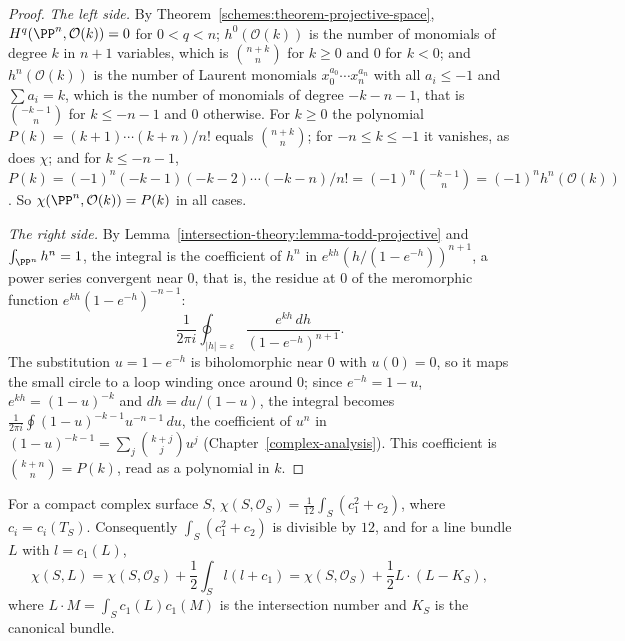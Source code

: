 \begin{proof}
\emph{The left side.} By Theorem~\ref{schemes:theorem-projective-space}, $H^q(\PP^n, \mathcal{O}(k)) = 0$ for $0 < q < n$; $h^0(\mathcal{O}(k))$ is the number of monomials of degree $k$ in $n + 1$ variables, which is
$\binom{n+k}{n}$ for $k \geq 0$ and $0$ for $k < 0$; and $h^n(\mathcal{O}(k))$ is the number of Laurent monomials $x_0^{a_0}\cdots x_n^{a_n}$ with all $a_i \leq -1$ and $\sum a_i = k$, which is the number of monomials of degree $-k - n - 1$,
that is $\binom{-k-1}{n}$ for $k \leq -n - 1$ and $0$ otherwise. For $k \geq 0$ the polynomial $P(k) = (k + 1)\cdots(k + n)/n!$ equals $\binom{n+k}{n}$; for $-n \leq k \leq -1$ it vanishes, as does $\chi$; and for $k \leq -n - 1$,
$P(k) = (-1)^n(-k - 1)(-k - 2)\cdots(-k - n)/n! = (-1)^n\binom{-k-1}{n} = (-1)^nh^n(\mathcal{O}(k))$. So $\chi(\PP^n, \mathcal{O}(k)) = P(k)$ in all cases.

\emph{The right side.} By Lemma~\ref{intersection-theory:lemma-todd-projective} and $\int_{\PP^n}h^n = 1$, the integral is the coefficient of $h^n$ in $e^{kh}(h/(1 - e^{-h}))^{n+1}$, a power series convergent near $0$, that is, the residue at
$0$ of the meromorphic function $e^{kh}(1 - e^{-h})^{-n-1}$:
\[
\frac{1}{2\pi i}\oint_{|h| = \varepsilon}\frac{e^{kh}\,dh}{(1 - e^{-h})^{n+1}}.
\]
The substitution $u = 1 - e^{-h}$ is biholomorphic near $0$ with $u(0) = 0$, so it maps the small circle to a loop winding once around $0$; since $e^{-h} = 1 - u$, $e^{kh} = (1 - u)^{-k}$ and $dh = du/(1 - u)$, the integral becomes
$\frac{1}{2\pi i}\oint(1 - u)^{-k-1}u^{-n-1}\,du$, the coefficient of $u^n$ in $(1 - u)^{-k-1} = \sum_j\binom{k + j}{j}u^j$ (Chapter~\ref{complex-analysis}). This coefficient is $\binom{k+n}{n} = P(k)$, read as a polynomial in $k$.
\end{proof}

\begin{corollary}\label{intersection-theory:corollary-noether}
For a compact complex surface $S$, $\chi(S, \mathcal{O}_S) = \frac{1}{12}\int_S(c_1^2 + c_2)$, where $c_i = c_i(T_S)$. Consequently $\int_S(c_1^2 + c_2)$ is divisible by $12$, and for a line bundle $L$ with $l = c_1(L)$,
\[
\chi(S, L) = \chi(S, \mathcal{O}_S) + \frac12\int_Sl(l + c_1) = \chi(S, \mathcal{O}_S) + \frac12L \cdot (L - K_S),
\]
where $L \cdot M = \int_Sc_1(L)c_1(M)$ is the intersection number and $K_S$ is the canonical bundle.
\end{corollary}


